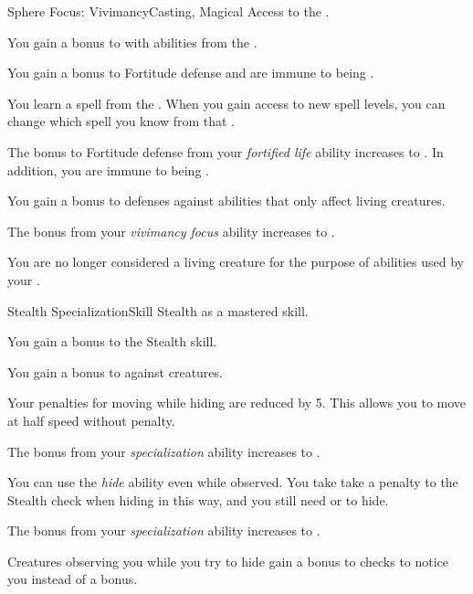     \begin{feat}{Sphere Focus: Vivimancy}{Casting, Magical}
        \featpre Access to the  .

         You gain a  bonus to  with abilities from the  .

         You gain a  bonus to Fortitude defense and are immune to being .

         You learn a spell from the  .
        When you gain access to new spell levels, you can change which spell you know from that .

         The bonus to Fortitude defense from your \textit{fortified life} ability increases to .
        In addition, you are immune to being .

         You gain a  bonus to defenses against abilities that only affect living creatures.

         The bonus from your \textit{vivimancy focus} ability increases to .

         You are no longer considered a living creature for the purpose of abilities used by your .
    \end{feat}

    \begin{feat}{Stealth Specialization}{Skill}
        \featpre Stealth as a mastered skill.

         You gain a  bonus to the Stealth skill.

         You gain a  bonus to  against  creatures.

         Your penalties for moving while hiding are reduced by 5.
        This allows you to move at half speed without penalty.

         The bonus from your \textit{specialization} ability increases to .

         You can use the \textit{hide} ability even while observed.
        You take take a  penalty to the Stealth check when hiding in this way, and you still need  or  to hide.

         The bonus from your \textit{specialization} ability increases to .

         Creatures observing you while you try to hide gain a  bonus to checks to notice you instead of a  bonus.
    \end{feat}

